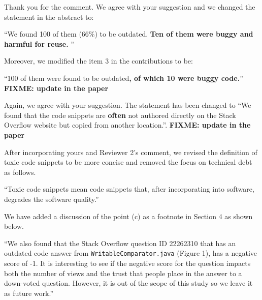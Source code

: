 \documentclass[a4paper,twoside,10pt]{reviewresponse}
\newcommand\FIXME[1]{{\color{red}\textbf{FIXME: #1}}}
\begin{document}
Thank you for the comment. We agree with your suggestion and we changed the statement in the abstract to:

``We found 100 of them (66\%) to be outdated. \textbf{Ten of them were buggy and harmful for reuse.} ''

Moreover, we modified the item 3 in the contributions to be:

``100 of them were found to be outdated\textbf{, of which 10 were buggy code.}'' \FIXME{update in the paper}


Again, we agree with your suggestion. The statement has been changed to ``We found that the code snippets are \textbf{often} not authored directly on the Stack Overflow website but copied from another location.''. \FIXME{update in the paper}


After incorporating yours and Reviewer 2's comment, we revised the definition of toxic code snippets to be more concise and removed the focus on technical debt as follows.

``Toxic code snippets mean code snippets that, after incorporating into software, degrades the software quality.''


We have added a discussion of the point (c) as a footnote in Section 4 as shown below.

``We also found that the Stack Overflow question ID 22262310 that has an outdated code answer from \texttt{WritableComparator.java} (Figure 1), has a negative score of -1. It is interesting to see if the negative score for the question impacts both the number of views and the trust that people place in the answer to a down-voted question. However, it is out of the scope of this study so we leave it as future work.''
\end{document}
